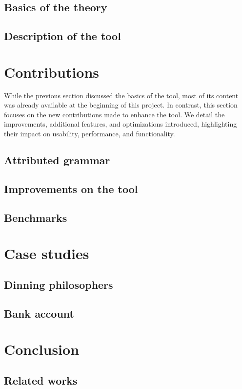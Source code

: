 \documentclass{article}
\theoremstyle{definition}
\theoremstyle{definition}
\begin{document}
\subsection{Basics of the theory}


\subsection{Description of the tool}


\section{Contributions}
While the previous section discussed the basics of the tool, most of its  
content was already available at the beginning of this project. In contrast,  
this section focuses on the new contributions made to enhance the  
tool. We detail the improvements, additional features, and  
optimizations introduced, highlighting their impact on usability,  
performance, and functionality.
\subsection{Attributed grammar}


\subsection{Improvements on the tool}


\subsection{Benchmarks}



\section{Case studies}

\subsection{Dinning philosophers}

\subsection{Bank account}


\section{Conclusion}


\subsection{Related works}


\newpage



\end{document}
